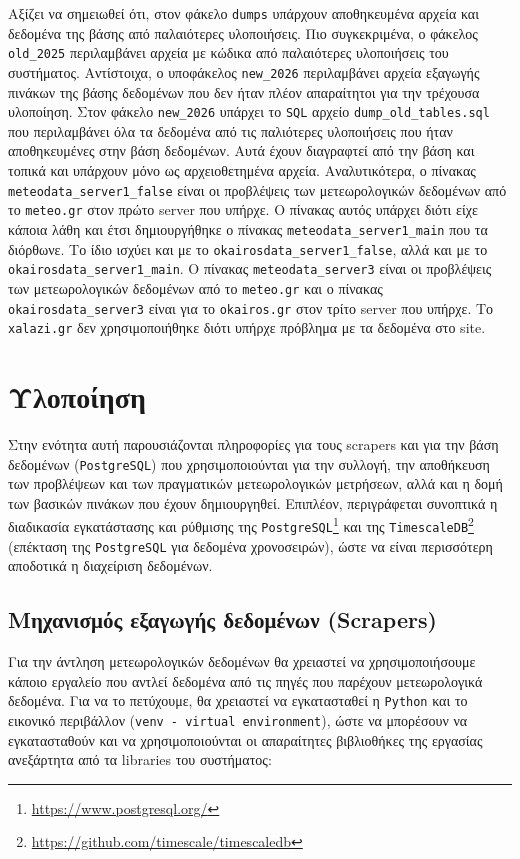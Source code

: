 \documentclass[a4paper,12pt]{article}
\begin{document}
Αξίζει να σημειωθεί ότι, στον φάκελο \texttt{dumps} υπάρχουν αποθηκευμένα αρχεία και δεδομένα της βάσης από παλαιότερες υλοποιήσεις. Πιο συγκεκριμένα, ο φάκελος \texttt{old\_2025} περιλαμβάνει αρχεία με κώδικα από παλαιότερες υλοποιήσεις του συστήματος. Αντίστοιχα, ο υποφάκελος \texttt{new\_2026} περιλαμβάνει αρχεία εξαγωγής πινάκων της βάσης δεδομένων που δεν ήταν πλέον απαραίτητοι για την τρέχουσα υλοποίηση. Στον φάκελο \texttt{new\_2026} υπάρχει το \texttt{SQL} αρχείο \texttt{dump\_old\_tables.sql} που περιλαμβάνει όλα τα δεδομένα από τις παλιότερες υλοποιήσεις που ήταν αποθηκευμένες στην βάση δεδομένων. Αυτά έχουν διαγραφτεί από την βάση και τοπικά και υπάρχουν μόνο ως αρχειοθετημένα αρχεία. Αναλυτικότερα, ο πίνακας \texttt{meteodata\_server1\_false} είναι οι προβλέψεις των μετεωρολογικών δεδομένων από το \texttt{meteo.gr} στον πρώτο server που υπήρχε. Ο πίνακας αυτός υπάρχει διότι είχε κάποια λάθη και έτσι δημιουργήθηκε ο πίνακας \texttt{meteodata\_server1\_main} που τα διόρθωνε. Το ίδιο ισχύει και με το \texttt{okairosdata\_server1\_false}, αλλά και με το \texttt{okairosdata\_server1\_main}. Ο πίνακας \texttt{meteodata\_server3} είναι οι προβλέψεις των μετεωρολογικών δεδομένων από το \texttt{meteo.gr} και ο πίνακας \texttt{okairosdata\_server3} είναι για το \texttt{okairos.gr} στον τρίτο server που υπήρχε. Το \texttt{xalazi.gr} δεν χρησιμοποιήθηκε διότι υπήρχε πρόβλημα με τα δεδομένα στο site.


\section{Υλοποίηση}\label{sec:implementation}
Στην ενότητα αυτή παρουσιάζονται πληροφορίες για τους scrapers και για την βάση δεδομένων (\texttt{PostgreSQL}) που χρησιμοποιούνται για την συλλογή, την αποθήκευση των προβλέψεων και των πραγματικών μετεωρολογικών μετρήσεων, αλλά και η δομή των βασικών πινάκων που έχουν δημιουργηθεί. Επιπλέον, περιγράφεται συνοπτικά η διαδικασία εγκατάστασης και ρύθμισης της \texttt{PostgreSQL}\footnote{\url{https://www.postgresql.org/}} και της \texttt{TimescaleDB}\footnote{\url{https://github.com/timescale/timescaledb}} (επέκταση της \texttt{PostgreSQL} για δεδομένα χρονοσειρών), ώστε να είναι περισσότερη αποδοτικά η διαχείριση δεδομένων.

\subsection{Μηχανισμός εξαγωγής δεδομένων (Scrapers)}\label{sec:scrapers}
Για την άντληση μετεωρολογικών δεδομένων θα χρειαστεί να χρησιμοποιήσουμε κάποιο εργαλείο που αντλεί δεδομένα από τις πηγές που παρέχουν μετεωρολογικά δεδομένα. Για να το πετύχουμε, θα χρειαστεί να εγκατασταθεί η \texttt{Python} και το εικονικό περιβάλλον (\texttt{venv - virtual environment}), ώστε να μπορέσουν να εγκατασταθούν και να χρησιμοποιούνται οι απαραίτητες βιβλιοθήκες της εργασίας ανεξάρτητα από τα libraries του συστήματος:
\end{document}
